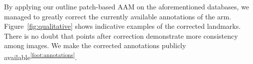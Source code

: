 By applying our outline patch-based AAM on the aforementioned databases, we managed to greatly correct the currently available annotations of the arm. Figure~\ref{fig:qualitative} shows indicative examples of the corrected landmarks. There is no doubt that points after correction demonstrate more consistency among images. We make the corrected annotations publicly available\textsuperscript{\ref{foot:annotations}}.






















